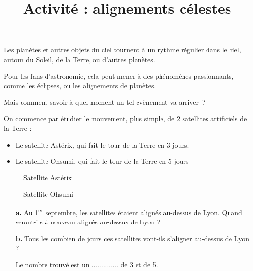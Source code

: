 \documentclass[a4paper,landscape,twocolumn]{article}
\title{Activité : alignements célestes}
\date{}
\begin{document}
\noindent\textbf{\huge {}}
\vspace{1em}

\begin{mybox}
	Les planètes et autres objets du ciel tournent à un rythme régulier dans le ciel, autour du Soleil, de la Terre, ou d’autres planètes.

	Pour les fans d’astronomie, cela peut mener à des phénomènes passionnants, comme les éclipses, ou les alignements de planètes.

	Mais comment savoir à quel moment un tel évènement va arriver ?
\end{mybox}
\begin{question}
	On commence par étudier le mouvement, plus simple, de 2 satellites artificiels de la Terre :
	\begin{itemize}
		\item Le satellite Astérix, qui fait le tour de la Terre en 3 jours.
		\item Le satellite Ohsumi, qui fait le tour de la Terre en 5 jours
	\end{itemize}

	\begin{figure}[h!]
		\captionsetup{labelformat=empty}
		\begin{floatrow}
			{\caption{Satellite Astérix}}

			{\caption{Satellite Ohsumi}}
		\end{floatrow}
	\end{figure}
	\begin{itemize}
		\item[\textbf{a.}] Au 1\textsuperscript{er} septembre, les satellites étaient alignés au-dessus de Lyon. Quand seront-ils à nouveau alignés au-dessus de Lyon ?
		\item[\textbf{b.}] Tous les combien de jours ces satellites vont-ils s'aligner au-dessus de Lyon ?

		      Le nombre trouvé est un .............. de 3 et de 5.
	\end{itemize}
\end{question}
\end{document}
